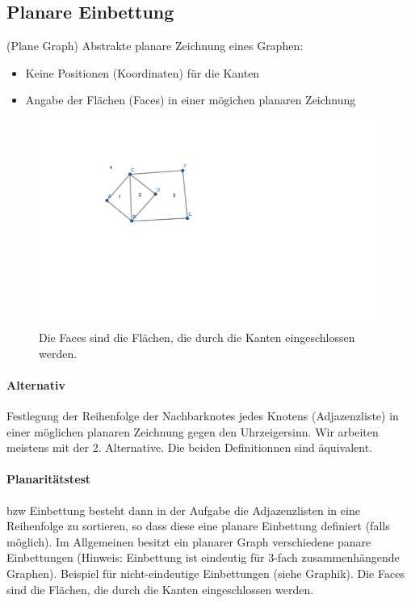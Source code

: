 \subsection{Planare Einbettung}
(Plane Graph) Abstrakte planare Zeichnung eines Graphen:
\begin{itemize}
    \item Keine Positionen (Koordinaten) für die Kanten
    \item Angabe der Flächen (Faces) in einer mögichen planaren Zeichnung 
\end{itemize}

\begin{figure}[h]
    \begin{center}
        \includegraphics[width=15cm]{faces}
        \caption{Die Faces sind die Flächen, die durch die Kanten eingeschlossen werden.}
        \label{fig:}
    \end{center}
\end{figure}



\paragraph{Alternativ} Festlegung der Reihenfolge der Nachbarknotes jedes Knotens (Adjazenzliste) in einer möglichen planaren Zeichnung gegen den Uhrzeigersinn. Wir arbeiten meistens mit der 2. Alternative. Die beiden Definitionnen sind äquivalent.

\paragraph{Planaritätstest} bzw Einbettung besteht dann in der Aufgabe die Adjazenzlisten in eine Reihenfolge zu sortieren, so dass diese eine planare Einbettung definiert (falls möglich). Im Allgemeinen besitzt ein planarer Graph verschiedene panare Einbettungen (Hinweis: Einbettung ist eindeutig für 3-fach zusammenhängende Graphen). Beispiel für nicht-eindeutige Einbettungen (siehe Graphik). Die Faces sind die Flächen, die durch die Kanten eingeschlossen werden.

